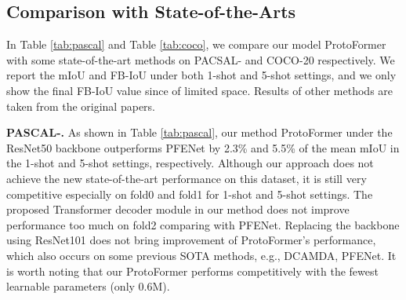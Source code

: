 \documentclass[journal]{IEEEtran}
\begin{document}
\begin{table}
     \caption{Ablation study on the effect of varying the number of Transformer decoder layers for 1-shot segmentation on PASCAL- using the mIoU and FB-IoU metrics. Numbers in bold indicate the best performance.}
    \label{tab:ab_decoder}
    \begin{center}
    \vspace{-2.0mm}
    \end{center}
\end{table}

\subsection{Comparison with State-of-the-Arts}
In Table \ref{tab:pascal} and Table \ref{tab:coco}, we compare our model ProtoFormer with some state-of-the-art methods on PACSAL- and COCO-20 respectively. We report the mIoU and FB-IoU under both 1-shot and 5-shot settings, and we only show the final FB-IoU value since of limited space. Results of other methods are taken from the original papers.

\noindent \textbf{PASCAL-.}
As shown in Table \ref{tab:pascal}, our method ProtoFormer under the ResNet50 backbone outperforms PFENet by 2.3\% and 5.5\% of the mean mIoU in the 1-shot and 5-shot settings, respectively. Although our approach does not achieve the new state-of-the-art performance on this dataset,  it is still very competitive especially on fold0 and fold1 for 1-shot and 5-shot settings. The proposed Transformer decoder module in our method does not improve performance too much on fold2 comparing with PFENet. Replacing the backbone using ResNet101 does not bring improvement of ProtoFormer's performance, which also occurs on some previous SOTA methods, e.g., DCAMDA, PFENet. It is worth noting that our ProtoFormer performs competitively with the fewest learnable parameters (only 0.6M). 
\end{document}
